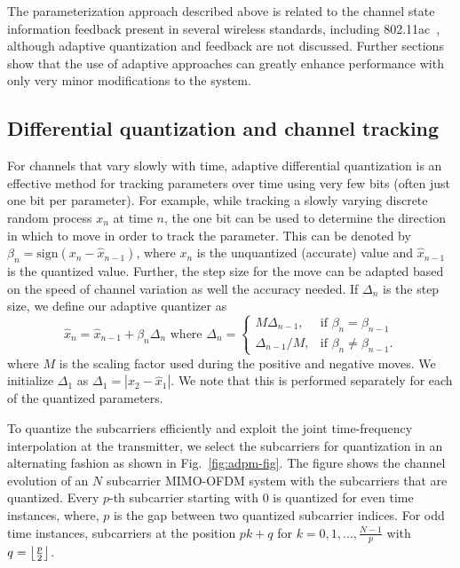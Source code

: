 \documentclass[journal,10pt,twocolumn]{IEEEtran}
\DeclarePairedDelimiter\floor{\lfloor}{\rfloor}
\begin{document}
The parameterization approach described above is related to the channel
state information feedback present in several wireless standards,
including 802.11ac~\cite{lou2013comparison}, although adaptive
quantization and feedback are not discussed. Further
sections show that the use of adaptive approaches can greatly enhance
performance with only very minor modifications to the system.
\subsection{Differential quantization and channel tracking}
\label{quantiz}
For channels that vary slowly with time, adaptive differential
quantization is an effective method for tracking parameters over time
using very few bits (often just one bit per parameter). For example,
while tracking a slowly varying discrete random process $x_n$ at time
$n$, the one bit can be used to determine the direction in which to
move in order to track the parameter. This can be denoted by
$\beta_{n} = \mbox{sign}(x_{n} - \hat{x}_{n-1})$, where $x_n$ is the
unquantized (accurate) value and $\hat{x}_{n-1}$ is the quantized
value. Further, the step size for the move can be adapted based on the
speed of channel variation as well the accuracy needed. If $\Delta_n$
is the step size, we define our adaptive quantizer as
\begin{equation}
\hat{x}_{n} = \hat{x}_{n-1} + \beta_{n}\Delta_{n} \mbox{ where }
\label{delta_eqn}
\Delta_{n} = \begin{cases}
    M \Delta_{n-1}, & \text{if $\beta_{n} = \beta_{n-1}$}\\
    \Delta_{n-1}/M , & \text{if $\beta_{n} \neq \beta_{n-1}$}.
  \end{cases}
\end{equation}
where $M$ is the scaling factor used during the positive and negative
moves. We initialize $\Delta_1$ as $\Delta_1 = |x_{2}-\hat{x}_1|$. We
note that this is performed separately for each of the quantized
parameters.

To quantize the subcarriers efficiently and exploit the joint
time-frequency interpolation at the transmitter, we select the
subcarriers for quantization in an alternating fashion as shown in
Fig.~\ref{fig:adpm-fig}. The figure shows the channel evolution of an
$N$ subcarrier MIMO-OFDM system with the subcarriers that are
quantized. Every $p$-th subcarrier starting with $0$ is quantized for
even time instances, where, $p$ is the gap between two quantized
subcarrier indices. For odd time instances, subcarriers at the
position $pk+q$ for $k = 0,1,..., \frac{N-1}{p}$ with $q =
{\floor*{\frac{p}{2}}}$.
\end{document}
